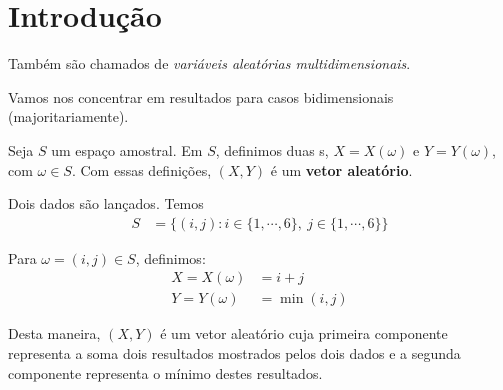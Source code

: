 \section{Introdução}

Também são chamados de
\textit{variáveis aleatórias multidimensionais}.

Vamos nos concentrar em resultados para casos bidimensionais
(majoritariamente).

Seja $S$ um espaço amostral. Em $S$, definimos duas
\va s, $X = X(\omega)$ e $Y = Y(\omega)$, com $\omega \in S$.
Com essas definições, $(X, Y)$ é um \textbf{vetor aleatório}.

\begin{center}
\end{center}

\begin{example}\label{exp:ch03-dois-dados}
    Dois dados são lançados. Temos
    \begin{align*}
        S &= \{
            (i, j) : 
            i \in \{1, \cdots, 6\},\ 
            j \in \{1, \cdots, 6\}
        \}
    \end{align*}

    Para $\omega = (i, j) \in S$, definimos:
    \begin{align*}
        X = X(\omega) &= i + j \\
        Y = Y(\omega) &= \min(i,  j)
    \end{align*}

    Desta maneira, $(X, Y)$ é um vetor aleatório
    cuja primeira componente representa a soma
    dois resultados mostrados pelos dois dados
    e a segunda componente representa o mínimo
    destes resultados.
\end{example}
